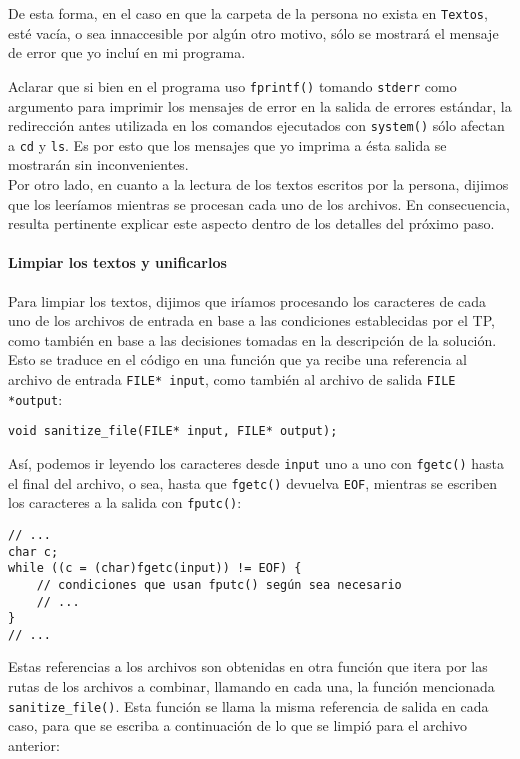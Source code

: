 \documentclass[a4paper]{article}
\begin{document}
De esta forma, en el caso en que la carpeta de la persona no exista en \texttt{Textos}, esté vacía, o sea innaccesible por algún otro motivo, sólo se mostrará el mensaje de error que yo incluí en mi programa.

Aclarar que si bien en el programa uso \texttt{fprintf()} tomando \texttt{stderr} como argumento para imprimir los mensajes de error en la salida de errores estándar, la redirección antes utilizada en los comandos ejecutados con \texttt{system()} sólo afectan a \texttt{cd} y \texttt{ls}. Es por esto que los mensajes que yo imprima a ésta salida se mostrarán sin inconvenientes. \\

Por otro lado, en cuanto a la lectura de los textos escritos por la persona, dijimos que los leeríamos mientras se procesan cada uno de los archivos. En consecuencia, resulta pertinente explicar este aspecto dentro de los detalles del próximo paso.

\paragraph{Limpiar los textos y unificarlos}

Para limpiar los textos, dijimos que iríamos procesando los caracteres de cada uno de los archivos de entrada en base a las condiciones establecidas por el TP, como también en base a las decisiones tomadas en la descripción de la solución. Esto se traduce en el código en una función que ya recibe una referencia al archivo de entrada \texttt{FILE* input}, como también al archivo de salida \texttt{FILE *output}:

\begin{verbatim}
void sanitize_file(FILE* input, FILE* output);
\end{verbatim}

Así, podemos ir leyendo los caracteres desde \texttt{input} uno a uno con \texttt{fgetc()} hasta el final del archivo, o sea, hasta que \texttt{fgetc()} devuelva \texttt{EOF}, mientras se escriben los caracteres a la salida con \texttt{fputc()}:

\begin{verbatim}
// ...
char c;
while ((c = (char)fgetc(input)) != EOF) {
    // condiciones que usan fputc() según sea necesario
    // ...
}
// ...
\end{verbatim}

Estas referencias a los archivos son obtenidas en otra función que itera por las rutas de los archivos a combinar, llamando en cada una, la función mencionada \texttt{sanitize\_file()}. Esta función se llama la misma referencia de salida en cada caso, para que se escriba a continuación de lo que se limpió para el archivo anterior:
\end{document}
